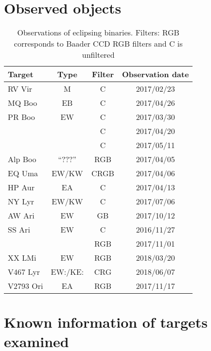 \section{Observed objects}
\begin{table}
    \centering
    \begin{tabular}[h]{l c c c}
    \toprule
    Target      & Type  & Filter    & Observation date \\ \bottomrule
    RV Vir      & M     & C         & 2017/02/23 \\ \midrule
    MQ Boo      & EB    & C         & 2017/04/26 \\ \midrule
    PR Boo      & EW    & C         & 2017/03/30 \\ \midrule
                &       & C         & 2017/04/20 \\ \midrule
                &       & C         & 2017/05/11 \\ \midrule
    Alp Boo     & ``???''   & RGB       & 2017/04/05 \\ \midrule
    EQ Uma      & EW/KW & CRGB      & 2017/04/06 \\ \midrule
    HP Aur      & EA    & C         & 2017/04/13 \\ \midrule
    NY Lyr      & EW/KW & C         & 2017/07/06 \\ \midrule
    AW Ari      & EW    & GB        & 2017/10/12 \\ \midrule
    SS Ari      & EW    & C         & 2016/11/27 \\ \midrule
                &       & RGB       & 2017/11/01 \\ \midrule
    XX LMi      & EW    & RGB       & 2018/03/20 \\ \midrule
    V467 Lyr    & EW:/KE:& CRG   & 2018/06/07 \\ \midrule
    V2793 Ori   & EA    & RGB   & 2017/11/17 \\
    \bottomrule
    \end{tabular}
    \caption{Observations of eclipsing binaries. Filters: RGB corresponds to Baader CCD RGB filters and C is unfiltered}\label{tab:observations}
\end{table}
\section{Known information of targets examined}

